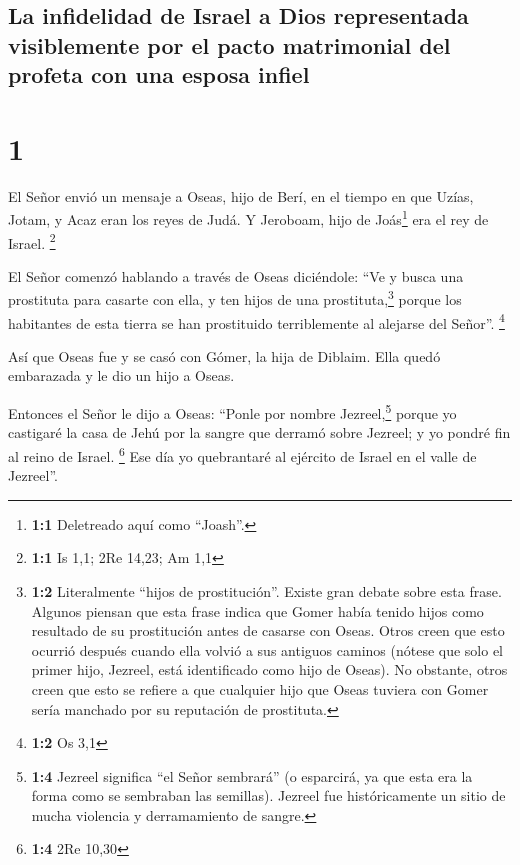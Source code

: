 \hypertarget{la-infidelidad-de-israel-a-dios-representada-visiblemente-por-el-pacto-matrimonial-del-profeta-con-una-esposa-infiel}{%
\subsection{La infidelidad de Israel a Dios representada visiblemente
por el pacto matrimonial del profeta con una esposa
infiel}\label{la-infidelidad-de-israel-a-dios-representada-visiblemente-por-el-pacto-matrimonial-del-profeta-con-una-esposa-infiel}}

\hypertarget{section}{%
\section{1}\label{section}}

 El Señor envió un mensaje a Oseas, hijo de Berí, en el
tiempo en que Uzías, Jotam, y Acaz eran los reyes de Judá. Y Jeroboam,
hijo de Joás\footnote{\textbf{1:1} Deletreado aquí como ``Joash''.} era
el rey de Israel. \footnote{\textbf{1:1} Is 1,1; 2Re 14,23; Am 1,1}

 El Señor comenzó hablando a través de Oseas diciéndole:
``Ve y busca una prostituta para casarte con ella, y ten hijos de una
prostituta,\footnote{\textbf{1:2} Literalmente ``hijos de
  prostitución''. Existe gran debate sobre esta frase. Algunos piensan
  que esta frase indica que Gomer había tenido hijos como resultado de
  su prostitución antes de casarse con Oseas. Otros creen que esto
  ocurrió después cuando ella volvió a sus antiguos caminos (nótese que
  solo el primer hijo, Jezreel, está identificado como hijo de Oseas).
  No obstante, otros creen que esto se refiere a que cualquier hijo que
  Oseas tuviera con Gomer sería manchado por su reputación de
  prostituta.} porque los habitantes de esta tierra se han prostituido
terriblemente al alejarse del Señor''. \footnote{\textbf{1:2} Os 3,1}

 Así que Oseas fue y se casó con Gómer, la hija de
Diblaim. Ella quedó embarazada y le dio un hijo a Oseas.

 Entonces el Señor le dijo a Oseas: ``Ponle por nombre
Jezreel,\footnote{\textbf{1:4} Jezreel significa ``el Señor sembrará''
  (o esparcirá, ya que esta era la forma como se sembraban las
  semillas). Jezreel fue históricamente un sitio de mucha violencia y
  derramamiento de sangre.} porque yo castigaré la casa de Jehú por la
sangre que derramó sobre Jezreel; y yo pondré fin al reino de Israel.
\footnote{\textbf{1:4} 2Re 10,30}  Ese día yo quebrantaré
al ejército de Israel en el valle de Jezreel''.

